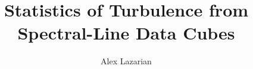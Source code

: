 



\def\Journal#1#2#3#4{(#1) {#2} {\bf #3}, #4}


\newcommand{\be}{\begin{equation}}
\newcommand{\ee}{\end{equation}}
\newcommand{\ba}{\begin{eqnarray}}
\newcommand{\ea}{\end{eqnarray}}
\def \d {{\rm d}}
\def \l {\langle}
\def \r {\rangle}
\def \ro {{\rm rck}}
\def \de {{\rm des}}

\def\AAp{\em Astron. Astrophys.}
\def\AJ{\em Astron.~J.}
\def\ApJ{\em Astrophys.~J.}
\def\ApJL{\em Astrophys.~J., Lett.}
\def\ApJSS{\em Astrophys.~J., Suppl. Ser.}
\def\AaAp{\em Astron. Astrophys.}
\def\ARFM{\em Annnu. Rev. Fluid Mech.}
\def\ARAaAp{\em Annnu. Rev. Astron. Astrophys.}
\def\MNRAS{\em Mon. Not. R.~Astron. Soc.}
\def\Nat{\em Nature\/}
\def\PASP{\em Publ. Astron. Soc. Pac.}
\def\VA{\em Vistas Astron.}
\def\IAUC{\em IAU Circ.}
\def\SA{\em Sov. Astron.}
\def\NC{\em Nuovo Cimento\/}
\def\NPB{{\em Nucl. Phys.} B}
\def\PLB{{\em Phys. Lett.}  B}
\def\PRL{\em Phys. Rev. Lett.}
\def\PRD{{\em Phys. Rev.} D}
\def\ZPC{{\em Z. Phys.} C}







\title{Statistics of Turbulence from Spectral-Line Data Cubes}

\author{Alex Lazarian}

\address{ Department of Astronomy, University of Wisconsin,
Madison, USA; email: lazarian@astro.wisc.edu}

\maketitle

